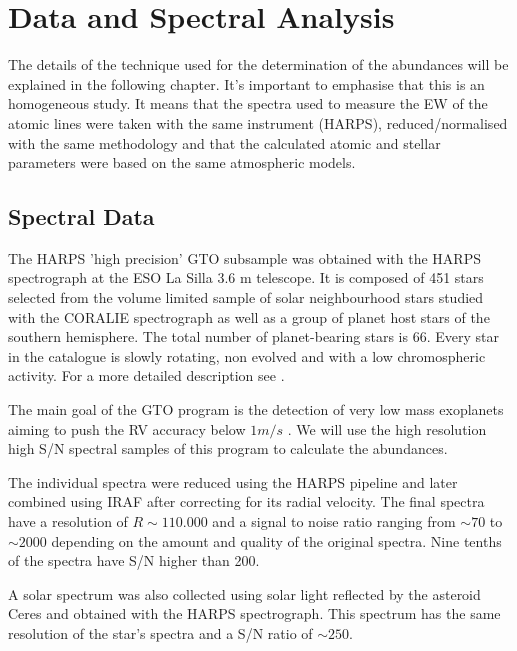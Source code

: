 \documentclass[dvips,12pt,a4paper]{report}
\begin{document}
{\chapter {Data and Spectral Analysis}
\label{chap_3}
The details of the technique used for the determination of the abundances will be explained in the following chapter.  It's important to emphasise that this is an homogeneous study. It means that the spectra used to measure the EW of the atomic lines were taken with the same instrument (HARPS), reduced/normalised with the same methodology and that the calculated atomic and stellar parameters were based on the same atmospheric models.

\section {Spectral Data}

The HARPS 'high precision' GTO subsample was obtained with the HARPS spectrograph at the ESO La Silla 3.6 m telescope. It is composed of 451 stars selected from the volume limited sample of solar neighbourhood stars studied with the CORALIE spectrograph \citep{Udry-2000} as well as a group of planet host stars of the southern hemisphere. The total number of planet-bearing stars is 66. Every star in the catalogue is slowly rotating, non evolved and with a low chromospheric activity. For a more detailed description see \citet{Sousa-2008}.

The main goal of the GTO program is the detection of very low mass exoplanets aiming to push the RV accuracy below  $1m/s$ \citep{Mayor-2003b}. We will use the high resolution high S/N spectral samples of this program to calculate the abundances. 

The individual spectra were reduced using the HARPS pipeline and later combined using IRAF after correcting for its radial velocity. The final spectra have a resolution of $R\sim110.000$ and a signal to noise ratio ranging from $\sim70$ to $\sim2000$ depending on the amount and quality of the original spectra. Nine tenths of the spectra have S/N higher than 200.


A solar spectrum was also collected using solar light reflected by the asteroid Ceres and obtained with the HARPS spectrograph. This spectrum has the same resolution of the star's spectra and a S/N ratio of $\sim250$. 

}
\end{document}

